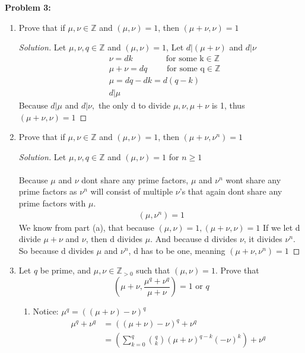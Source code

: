 \documentclass[12pt]{article}
\begin{document}
\newpage 
\noindent \textbf{Problem 3: }
	\begin{enumerate}[label = (\alph*)]
		\item Prove that if $\mu,\nu \in \mathbb{Z}$ and $(\mu,\nu) = 1$, then $(\mu + \nu,\nu) = 1$
		\begin{proof}[Solution]
			Let $\mu,\nu,q \in \mathbb{Z}$ and $(\mu,\nu) = 1$, Let $d|(\mu + \nu)$ and $d|\nu$
			\begin{align*}
				&\nu = dk \qquad \qquad \text{for some k} \in \mathbb{Z} \\
				&\mu + \nu = dq \qquad \text{ for some q} \in \mathbb{Z} \\
				&\mu = dq - dk = d(q - k) \\
				&d|\mu
			\end{align*}
			Because $d|\mu$ and $d|\nu,$ the only d to divide $\mu, \nu, \mu + \nu$ is 1, thus $(\mu + \nu,\nu) = 1$
		\end{proof}
		\item Prove that if $\mu,\nu \in \mathbb{Z}$ and $(\mu,\nu) = 1$, then $(\mu + \nu,\nu^n) = 1$
		\begin{proof}[Solution]
			Let $\mu,\nu,q \in \mathbb{Z}$ and $(\mu,\nu) = 1$ for $n \geq 1$ \\ \\
			Because $\mu$ and $\nu$ dont share any prime factors, $\mu$ and $\nu^n$ wont share any prime factors as $\nu^n$ will consist of multiple $\nu$'s that again dont share any prime factors with $\mu$. 
			\begin{align*}
				(\mu,\nu^n) = 1
			\end{align*} 
			We know from part (a), that because $(\mu,\nu) = 1, (\mu + \nu,\nu) = 1$ If we let d divide $\mu + \nu$ and $\nu$, then d divides $\mu$. And because d divides $\nu$, it divides $\nu^n$.  So because d divides $\mu$ and $\nu ^ n$, d has to be one, meaning $(\mu + \nu,\nu^n) = 1$ 
		\end{proof}
		\item Let $q$ be prime, and $\mu,\nu \in \mathbb{Z}_{>0}$ such that $(\mu,\nu) = 1$. Prove that
		$$ \left( \mu + \nu, \frac{\mu ^ q + \nu^q}{\mu + \nu}\right) = 1 \text{ or } q $$ 
		\begin{enumerate}[label = (\roman*)]
			\item Notice: $\mu^q = ((\mu + \nu) - \nu)^q$
			\begin{align*}
				\mu^q +  \nu^q &= ((\mu + \nu) - \nu)^q + \nu^q \\
				&= \left(\sum_{k = 0}^{q} \binom{q}{k} (\mu + \nu)^{q-k} (-\nu)^k\right) + \nu^q \\

\end{align*}
\end{enumerate}
\end{enumerate}
\end{document}
